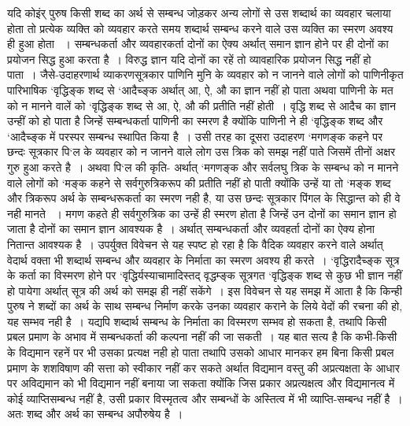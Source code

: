 {यदि कोइंर् पुरुष किसी शब्द का अर्थ से सम्बन्ध जोड़कर अन्य लोगों से उस शब्दार्थ का व्यवहार चलाया होता तो प्रत्येक व्यक्ति को व्यवहार करते समय शब्दार्थ सम्बन्ध करने वाले उस व्यक्ति का स्मरण अवश्य ही हुआ होता ~। सम्बन्धकर्ता और व्यवहारकर्ता दोनों का ऐक्य अर्थात् समान ज्ञान होने पर ही दोनों का प्रयोजन सिद्ध हुआ करता है~। विरुद्ध ज्ञान यदि दोनों का रहें तो व्यावहारिक प्रयोजन सिद्ध नहीं हो पाता~। जैसे-उदाहरणार्थ व्याकरणसूत्रकार पाणिनि मुनि के व्यवहार को न जानने वाले लोगों को पाणिनीकृत पारिभाषिक ‘वृद्धिङ्क शब्द से ‘आदैच्ङ्क अर्थात् आ, ऐ, औ का ज्ञान नहीं हो पाता अथवा पाणिनी के मत को न मानने वालें को ‘वृद्धिङ्क शब्द से आ, ऐ, औ की प्रतीति नहीं होती~। वृद्धि शब्द से आदैच का ज्ञान उन्हीं को हो पाता है जिन्हें  सम्बन्धकर्ता पाणिनी का स्मरण है क्योंकि पाणिनी ने ही ‘वृद्धिङ्क शब्द और ‘आदैच्ङ्क में परस्पर सम्बन्ध स्थापित किया है~। उसी तरह का दूसरा उदाहरण ‘मगणङ्क कहने पर छन्दः सूत्रकार पि‘ल के व्यवहार को न जानने वाले लोग उस त्रिक को समझ नहीं पाते जिसमें तीनों अक्षर गुरु हुआ करते है~। अथवा पि‘ल की कृति- अर्थात् ‘मगणङ्क और सर्वलघु त्रिक के सम्बन्ध को न मानने वाले लोगों को ‘मङ्क कहने से सर्वगुरुत्रिकरूप की प्रतीति नहीं हो पाती क्योंकि उन्हें या तो ‘मङ्क शब्द और त्रिकरूप अर्थ के सम्बन्धरूकर्ता का स्मरण नही है, या उस छन्दः सूत्रकार पिंगल के सिद्धान्त को ही वे नही मानते ~। मगण कहते ही सर्वगुरुत्रिक का उन्हें ही स्मरण होता है जिन्हें उन दोनों का समान ज्ञान हो जाता है दोनों का समान ज्ञान आवश्यक है~। अर्थात् सम्बन्धकर्ता और व्यवहर्ता दोनों का ऐक्य होना नितान्त आवश्यक है~। उपर्युक्त विवेचन से यह स्पष्ट हो रहा है कि वैदिक व्यवहार करने वाले अर्थात् वेदार्थ वक्ता भी शब्दार्थ  सम्बन्ध और व्यवहार के निर्माता का स्मरण अवश्य ही करते~। ‘वृद्धिरादैच्ङ्क सूत्र के कर्ता का विस्मरण होने पर ‘वृद्धिर्यस्याचामादिस्तद्  वृद्धम्ङ्क सूत्रगत ‘वृद्धिङ्क शब्द से कुछ भी ज्ञान नहीं हो पायेगा अर्थात् सूत्र की अर्थ को समझ ही नहीं सकेंगे~। इस विवेचन से यह समझ में आता है कि किन्ही पुरुष ने शब्दों का अर्थ के साथ सम्बन्ध निर्माण करके उनका व्यवहार कराने के लिये वेदों की रचना की हो, यह सम्भव नही है~। यद्यपि शब्दार्थ सम्बन्ध के निर्माता का विस्मरण सम्भव हो सकता है, तथापि किसी प्रबल प्रमाण के अभाव में सम्बन्धकर्ता की कल्पना नहीं की जा सकती~। यह बात सत्य है कि कभी-किसी के विद्यमान रहनें पर भी उसका प्रत्यक्ष नही हो पाता तथापि उसको आधार मानकर हम बिना किसी प्रबल प्रमाण के शशविषाण की सत्ता को स्वीकार नहीं कर सकते अर्थात विद्यमान वस्तु की अप्रत्यक्षता के आधार पर अविद्यमान को भी विद्यमान नहीं बनाया जा सकता क्योंकि जिस प्रकार अप्रत्यक्षत्व और विद्यमानत्व में कोई व्याप्तिसम्बन्ध नहीं है, उसी प्रकार विस्मृतत्व और सम्बन्धों के अस्तित्व में भी व्याप्ति-सम्बन्ध नहीं है~। अतः शब्द और अर्थ का सम्बन्ध अपौरुषेय है~।

}
